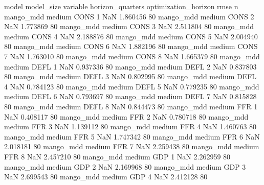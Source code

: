             model model_size variable  horizon_quarters optimization_horizon      rmse  n
        mango_mdd     medium     CONS                 1                  NaN  1.860456 80
        mango_mdd     medium     CONS                 2                  NaN  1.773869 80
        mango_mdd     medium     CONS                 3                  NaN  2.511804 80
        mango_mdd     medium     CONS                 4                  NaN  2.188876 80
        mango_mdd     medium     CONS                 5                  NaN  2.004940 80
        mango_mdd     medium     CONS                 6                  NaN  1.882196 80
        mango_mdd     medium     CONS                 7                  NaN  1.763010 80
        mango_mdd     medium     CONS                 8                  NaN  1.665379 80
        mango_mdd     medium     DEFL                 1                  NaN  0.937336 80
        mango_mdd     medium     DEFL                 2                  NaN  0.837803 80
        mango_mdd     medium     DEFL                 3                  NaN  0.802995 80
        mango_mdd     medium     DEFL                 4                  NaN  0.784123 80
        mango_mdd     medium     DEFL                 5                  NaN  0.779235 80
        mango_mdd     medium     DEFL                 6                  NaN  0.793697 80
        mango_mdd     medium     DEFL                 7                  NaN  0.815828 80
        mango_mdd     medium     DEFL                 8                  NaN  0.844473 80
        mango_mdd     medium      FFR                 1                  NaN  0.408117 80
        mango_mdd     medium      FFR                 2                  NaN  0.780718 80
        mango_mdd     medium      FFR                 3                  NaN  1.139112 80
        mango_mdd     medium      FFR                 4                  NaN  1.460763 80
        mango_mdd     medium      FFR                 5                  NaN  1.747342 80
        mango_mdd     medium      FFR                 6                  NaN  2.018181 80
        mango_mdd     medium      FFR                 7                  NaN  2.259438 80
        mango_mdd     medium      FFR                 8                  NaN  2.457210 80
        mango_mdd     medium      GDP                 1                  NaN  2.262959 80
        mango_mdd     medium      GDP                 2                  NaN  2.169968 80
        mango_mdd     medium      GDP                 3                  NaN  2.699543 80
        mango_mdd     medium      GDP                 4                  NaN  2.412128 80
